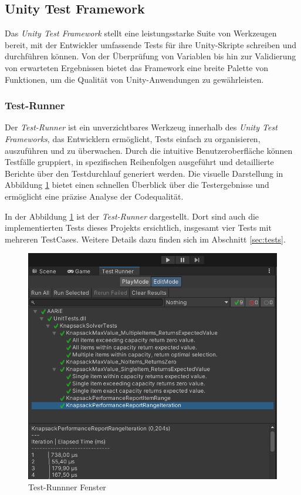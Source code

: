 \begin{itemize}
\subsection{\label{sec:testFramework}Unity Test Framework}

Das \textit{Unity Test Framework} stellt eine leistungsstarke Suite von Werkzeugen bereit, mit der Entwickler umfassende Tests für ihre Unity-Skripte schreiben und durchführen können. Von der Überprüfung von Variablen bis hin zur Validierung von erwarteten Ergebnissen bietet das Framework eine breite Palette von Funktionen, um die Qualität von Unity-Anwendungen zu gewährleisten.

\subsubsection{\label{sec:testRunner} Test-Runner}

Der \textit{Test-Runner} ist ein unverzichtbares Werkzeug innerhalb des \textit{Unity Test Frameworks}, das Entwicklern ermöglicht, Tests einfach zu organisieren, auszuführen und zu überwachen. Durch die intuitive Benutzeroberfläche können Testfälle gruppiert, in spezifischen Reihenfolgen ausgeführt und detaillierte Berichte über den Testdurchlauf generiert werden. Die visuelle Darstellung in Abbildung \ref{fig:testRunner} bietet einen schnellen Überblick über die Testergebnisse und ermöglicht eine präzise Analyse der Codequalität.

In der Abbildung \ref{fig:testRunner} ist der \textit{Test-Runner} dargestellt. Dort sind auch die implementierten Tests dieses Projekts ersichtlich, insgesamt vier Tests mit mehreren TestCases. Weitere Details dazu finden sich im Abschnitt \ref{sec:tests}.

\begin{figure}[H]
\centering
\includegraphics[scale=0.5, angle=0]{images/testRunner}
\caption{Test-Runnner Fenster}
\label{fig:testRunner}
\end{figure}


\end{itemize}
